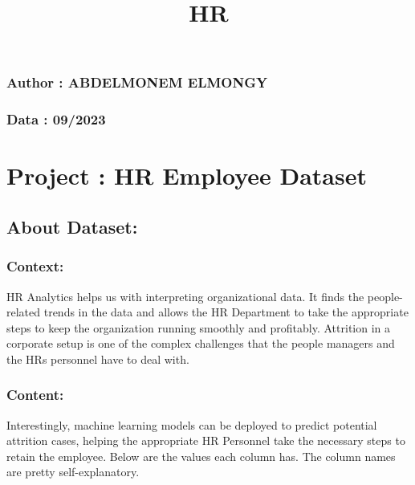 \documentclass[11pt]{article}
\title{HR}
\begin{document}
    
    \maketitle
    
    

    
    \hypertarget{author-abdelmonem-elmongy}{%
\subsubsection{Author : ABDELMONEM
ELMONGY}\label{author-abdelmonem-elmongy}}

\hypertarget{data-092023}{%
\subsubsection{Data : 09/2023}\label{data-092023}}

    \hypertarget{project-hr-employee-dataset}{%
\section{Project : HR Employee
Dataset}\label{project-hr-employee-dataset}}

    \hypertarget{about-dataset}{%
\subsection{About Dataset:}\label{about-dataset}}

\hypertarget{context}{%
\subsubsection{Context:}\label{context}}

HR Analytics helps us with interpreting organizational data. It finds
the people-related trends in the data and allows the HR Department to
take the appropriate steps to keep the organization running smoothly and
profitably. Attrition in a corporate setup is one of the complex
challenges that the people managers and the HRs personnel have to deal
with.

\hypertarget{content}{%
\subsubsection{Content:}\label{content}}

Interestingly, machine learning models can be deployed to predict
potential attrition cases, helping the appropriate HR Personnel take the
necessary steps to retain the employee. Below are the values each column
has. The column names are pretty self-explanatory.
\end{document}
